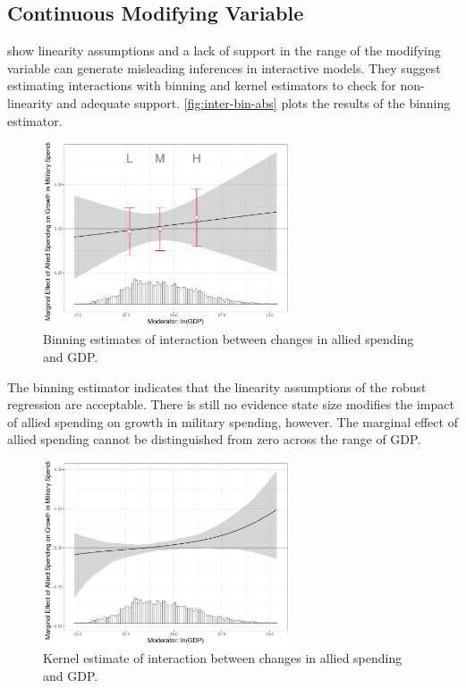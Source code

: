 \documentclass[12pt]{article}
\begin{document}
\subsection{Continuous Modifying Variable}


\citet{Hainmuelleretal2019} show linearity assumptions and a lack of support in the range of the modifying variable can generate misleading inferences in interactive models. 
They suggest estimating interactions with binning and kernel estimators to check for non-linearity and adequate support. 
\autoref{fig:inter-bin-abs} plots the results of the binning estimator. 


\begin{figure}
	\centering
		\includegraphics[width=0.65\textwidth]{inter-bin-abs.pdf}
		\caption{Binning estimates of interaction between changes in allied spending and GDP.}
	\label{fig:inter-bin-abs}
\end{figure}


The binning estimator indicates that the linearity assumptions of the robust regression are acceptable. 
There is still no evidence state size modifies the impact of allied spending on growth in military spending, however. 
The marginal effect of allied spending cannot be distinguished from zero across the range of GDP. 


\begin{figure}
	\centering
		\includegraphics[width=0.65\textwidth]{inter-kernel-abs.pdf}
	\caption{Kernel estimate of interaction between changes in allied spending and GDP.}
	\label{fig:inter-kernel-abs}
\end{figure}
\end{document}
